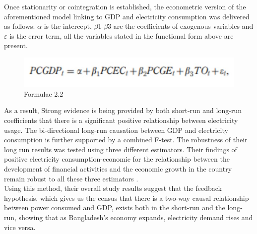 \documentclass[conference]{IEEEtran}
\begin{document}
Once stationarity or cointegration is established, the econometric version of the aforementioned model linking to GDP and electricity
consumption was delivered as follows: $\alpha$  is the intercept, $\beta$1-$\beta$3 are the coefficients of exogenous variables
and $\varepsilon$  is the error term, all the variables stated in the functional form above are present. \\

\begin{figure}[htbp]
    \centerline{\includegraphics[scale=0.6]{electricity3.jpg}}
    \caption{Formulae 2.2}
\end{figure}
As a result, Strong evidence is being provided by both short-run and long-run coefficients that there is a significant positive relationship between electricity usage.
The bi-directional long-run causation between GDP and electricity consumption is further supported by a combined F-test. The robustness of their long run results was tested using three different estimators.
Their findings of positive electricity consumption-economic for the relationship between the development of financial activities and the economic growth in the country remain robust to all these three estimators .\\
Using this method, their overall study results suggest that the feedback hypothesis, which gives us the census that there is a two-way causal relationship between power consumed and GDP, exists both in the short-run and the long-run, showing that as Bangladesh's economy expands, electricity demand rises and vice versa.
\end{document}
